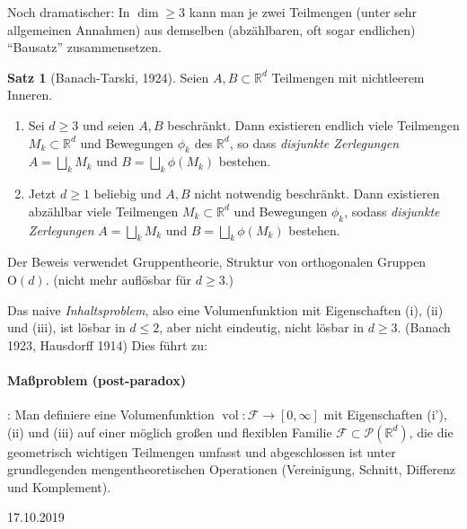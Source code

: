\documentclass[12pt,a4paper]{article}
\theoremstyle{definition}
\newtheorem*{satz}{Satz}
\theoremstyle{remark}
\newcommand{\R}{\mathbb{R}}
\newcommand{\vol}{\operatorname{vol}}
\begin{document}
Noch dramatischer: In $\dim \geq 3$ kann man je zwei Teilmengen (unter sehr allgemeinen Annahmen) aus demselben (abzählbaren, oft sogar endlichen) ``Bausatz'' zusammensetzen.
\begin{satz}[Banach-Tarski, 1924] Seien $A,B\subset \R^d$ Teilmengen mit nichtleerem Inneren.
\begin{enumerate}[(\roman*)]
\item Sei $d \geq 3$ und seien $A,B$ beschränkt. Dann existieren endlich viele Teilmengen $M_k \subset \R^d$ und Bewegungen $\phi_k$ des $\R^d$, so dass \emph{disjunkte Zerlegungen} $A=\bigsqcup_k M_k$ und $B = \bigsqcup_k \phi(M_k)$ bestehen.
\item Jetzt $d\geq 1$ beliebig und $A,B$ nicht notwendig beschränkt. Dann existieren abzählbar viele Teilmengen $M_k \subset \R^d$ und Bewegungen $\phi_k$, sodass  \emph{disjunkte Zerlegungen} $A=\bigsqcup_k M_k$ und $B = \bigsqcup_k \phi(M_k)$ bestehen.
\end{enumerate}
Der Beweis verwendet Gruppentheorie, Struktur von orthogonalen Gruppen $\mathrm{O}(d)$. (nicht mehr auflösbar für $d\geq 3$.)
\end{satz}
Das naive \emph{Inhaltsproblem}, also eine Volumenfunktion mit Eigenschaften (i), (ii) und (iii), ist lösbar in $d\leq 2$, aber nicht eindeutig, nicht lösbar in $d\geq 3$. (Banach 1923, Hausdorff 1914) Dies führt zu:
\vspace{-10pt}
\paragraph{Maßproblem (post-paradox)}: Man definiere eine Volumenfunktion $\vol: \mathcal{F} \longrightarrow [0,\infty]$ mit Eigenschaften (i'), (ii) und (iii) auf einer möglich großen und flexiblen Familie $\mathcal{F} \subset \mathcal{P}(\R^d)$, die die geometrisch wichtigen Teilmengen umfasst und abgeschlossen ist unter grundlegenden mengentheoretischen Operationen (Vereinigung, Schnitt, Differenz und Komplement). 
\begin{scriptsize}
\begin{flushright}
17.10.2019
\end{flushright}
\end{scriptsize}
\end{document}
